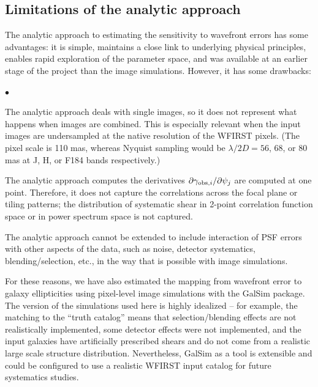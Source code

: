 \documentclass[aps,prd, amsmath,amssymb,superscriptaddress,showkeys,nofootinbib,reprint,preprintnumbers]{revtex4-1}
\begin{document}
\subsection{Limitations of the analytic approach}

The analytic approach to estimating the sensitivity to wavefront errors has some advantages: it is simple, maintains a close link to underlying physical principles, enables rapid exploration of the parameter space, and was available at an earlier stage of the project than the image simulations. However, it has some drawbacks:
\begin{list}{$\bullet$}{}
\item The analytic approach deals with single images, so it does not represent what happens when images are combined. This is especially relevant when the input images are undersampled at the native resolution of the WFIRST pixels. (The pixel scale is 110 mas, whereas Nyquist sampling would be $\lambda/2D = 56$, 68, or 80 mas at J, H, or F184 bands respectively.)
\item The analytic approach computes the derivatives $\partial\gamma_{{\rm obs},i}/\partial\psi_j$ are computed at one point. Therefore, it does not capture the correlations across the focal plane or tiling patterns; the distribution of systematic shear in 2-point correlation function space or in power spectrum space is not captured.
\item The analytic approach cannot be extended to include interaction of PSF errors with other aspects of the data, such as noise, detector systematics, blending/selection, etc., in the way that is possible with image simulations.
\end{list}
For these reasons, we have also estimated the mapping from wavefront error to galaxy ellipticities using pixel-level image simulations with the {\sc GalSim} package. The version of the simulations used here is highly idealized -- for example, the matching to the ``truth catalog'' means that selection/blending effects are not realistically implemented, some detector effects were not implemented, and the input galaxies have artificially prescribed shears and do not come from a realistic large scale structure distribution. Nevertheless, {\sc GalSim} as a tool is extensible and could be configured to use a realistic WFIRST input catalog for future systematics studies.

\end{document}
